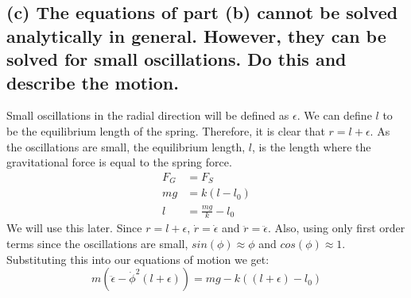 \documentclass{article}
\begin{document}
\subsection*{(c) The equations of part (b) cannot be solved analytically in general. However, they can be solved for small oscillations. Do this and describe the motion.}

Small oscillations in the radial direction will be defined as $\epsilon$. We can define $l$ to be the equilibrium length of the spring. Therefore, it is clear that $r = l+ \epsilon$. As the oscillations are small, the equilibrium length, $l$, is the length where the gravitational force is equal to the spring force. 
\begin{align*}
F_G &= F_S\\
mg &= k(l-l_0)\\
l &= \frac{mg}{k} - l_0
\end{align*}
We will use this later. Since $r= l+ \epsilon$, $\dot{r} = \dot{\epsilon}$ and $\ddot{r} = \ddot{\epsilon}$. Also, using only first order terms since the oscillations are small, $sin(\phi) \approx \phi$ and  $cos(\phi) \approx 1$. Substituting this into our equations of motion we get:
$$m (\ddot{\epsilon} - \dot{\phi}^2(l+ \epsilon)) =  mg- k((l+ \epsilon)-l_0)$$
\end{document}
